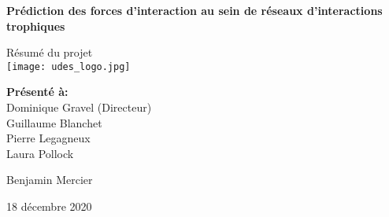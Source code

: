 \begin{titlepage}
    \begin{center}

        \vspace*{-6em}
        
        \Large{\textbf{Prédiction des forces d'interaction au sein de réseaux d'interactions trophiques}}\\

        \vspace{3em}

        {Résumé du projet}\\
        \vspace{3em}
        \texttt{[image: udes\_logo.jpg]}\\
        \vspace{3em}

        \normalsize{\textbf{Présenté à:}\\
        Dominique Gravel (Directeur)\\
        Guillaume Blanchet\\
        Pierre Legagneux\\
        Laura Pollock\\}

        \vspace{8em}
        {Benjamin Mercier}

        18 décembre 2020

    \end{center}
\end{titlepage}